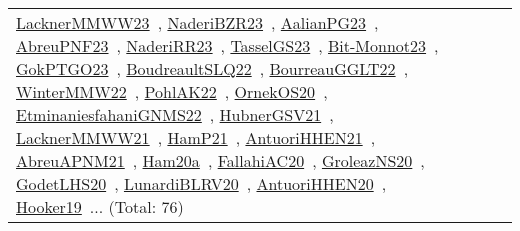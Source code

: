 {\begin{longtable}{lp{3cm}>{\raggedright\arraybackslash}p{6cm}>{\raggedright\arraybackslash}p{6cm}>{\raggedright\arraybackslash}p{8cm}}
\href{../works/LacknerMMWW23.pdf}{LacknerMMWW23}~\cite{LacknerMMWW23}, \href{../works/NaderiBZR23.pdf}{NaderiBZR23}~\cite{NaderiBZR23}, \href{../works/AalianPG23.pdf}{AalianPG23}~\cite{AalianPG23}, \href{../works/AbreuPNF23.pdf}{AbreuPNF23}~\cite{AbreuPNF23}, \href{../works/NaderiRR23.pdf}{NaderiRR23}~\cite{NaderiRR23}, \href{../works/TasselGS23.pdf}{TasselGS23}~\cite{TasselGS23}, \href{../works/Bit-Monnot23.pdf}{Bit-Monnot23}~\cite{Bit-Monnot23}, \href{../works/GokPTGO23.pdf}{GokPTGO23}~\cite{GokPTGO23}, \href{../works/BoudreaultSLQ22.pdf}{BoudreaultSLQ22}~\cite{BoudreaultSLQ22}, \href{../works/BourreauGGLT22.pdf}{BourreauGGLT22}~\cite{BourreauGGLT22}, \href{../works/WinterMMW22.pdf}{WinterMMW22}~\cite{WinterMMW22}, \href{../works/PohlAK22.pdf}{PohlAK22}~\cite{PohlAK22}, \href{../works/OrnekOS20.pdf}{OrnekOS20}~\cite{OrnekOS20}, \href{../works/EtminaniesfahaniGNMS22.pdf}{EtminaniesfahaniGNMS22}~\cite{EtminaniesfahaniGNMS22}, \href{../works/HubnerGSV21.pdf}{HubnerGSV21}~\cite{HubnerGSV21}, \href{../works/LacknerMMWW21.pdf}{LacknerMMWW21}~\cite{LacknerMMWW21}, \href{../works/HamP21.pdf}{HamP21}~\cite{HamP21}, \href{../works/AntuoriHHEN21.pdf}{AntuoriHHEN21}~\cite{AntuoriHHEN21}, \href{../works/AbreuAPNM21.pdf}{AbreuAPNM21}~\cite{AbreuAPNM21}, \href{../works/Ham20a.pdf}{Ham20a}~\cite{Ham20a}, \href{../works/FallahiAC20.pdf}{FallahiAC20}~\cite{FallahiAC20}, \href{../works/GroleazNS20.pdf}{GroleazNS20}~\cite{GroleazNS20}, \href{../works/GodetLHS20.pdf}{GodetLHS20}~\cite{GodetLHS20}, \href{../works/LunardiBLRV20.pdf}{LunardiBLRV20}~\cite{LunardiBLRV20}, \href{../works/AntuoriHHEN20.pdf}{AntuoriHHEN20}~\cite{AntuoriHHEN20}, \href{../works/Hooker19.pdf}{Hooker19}~\cite{Hooker19}... (Total: 76)\\

\end{longtable}}
